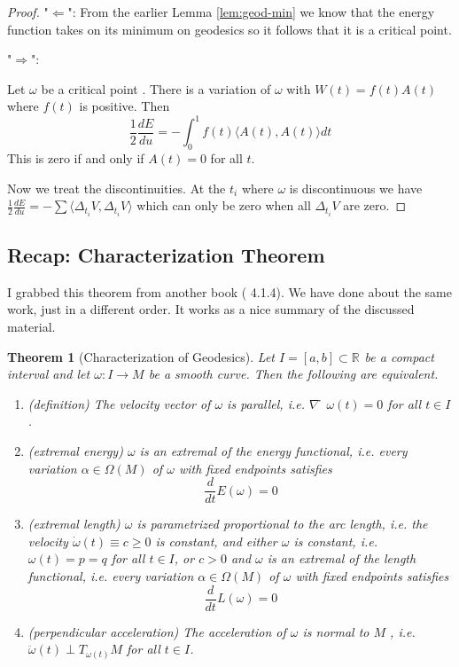 \documentclass{article}
\newtheorem{thm}{Theorem}
\newtheorem{proof}{Proof}
\renewcommand{\Rn}[1][n]{\mathbb{R}^{#1}}
\newcommand{\angle}[1]{\langle #1 \rangle}
\newcommand{\ome}{ $\omega$ }
\begin{document}
\begin{proof}

    "$\Leftarrow$": From the earlier Lemma \ref{lem:geod-min} we know that the energy function takes on its minimum on geodesics so it follows that it is a critical point.

    "$\Rightarrow$":


    Let \ome be a critical point . There is a variation of \ome with $W(t) = f (t)A(t)$ where
    $f(t)$ is positive.
    Then
    \[
        \frac{1}{2}\frac{dE}{du} = - \int_0^1 f(t) \angle{A(t), A(t)} dt
    \]
    This is zero if and only if $A(t) = 0$ for all $t$.

    Now we treat the discontinuities. At the $t_i$ where \ome is discontinuous we have
    $\frac{1}{2}\frac{dE}{du} = -\sum \angle{\Delta_{t_i}V, \Delta_{t_i}V}$ which can only be zero when all $\Delta_{t_i}V$ are zero.


\end{proof}



\subsection{Recap: Characterization Theorem}


I grabbed this theorem from another book (\cite{salamon} 4.1.4).
We have done about the same work, just in a different order.
It works as a nice summary of the discussed material.

\begin{thm}[Characterization of Geodesics]
    Let $I = [a, b] \subset \Rn[]$ be a compact interval and let $\omega : I \rightarrow M$ be a
    smooth curve. Then the following are equivalent.

    \begin{enumerate}
        \item
            (definition)
            The velocity vector of $\omega$ is parallel, i.e. $\nabla  ̇\omega(t) = 0$ for all $t \in I$.
        \item
            (extremal energy) $\omega$ is an extremal of the energy functional, i.e. every variation $\alpha \in \Omega(M)$
            of $\omega$ with fixed endpoints satisfies
            \[
                \frac{d}{dt} E(\omega) = 0
            \]
        \item
            (extremal length)
            $\omega$ is parametrized proportional to the arc length, i.e. the velocity
            $\dot{\omega}(t) \equiv c ≥ 0$ is constant, and either $\omega$ is constant, i.e. $\omega(t) = p = q$ for
            all $t \in I$, or $c > 0$ and $\omega$ is an extremal of the length functional, i.e.
            every variation $\alpha \in \Omega(M)$ of $\omega$ with fixed endpoints satisfies
            \[
                \frac{d}{dt} L(\omega) = 0
            \]
        \item
            (perpendicular acceleration)
            The acceleration of $\omega$ is normal to $M$ , i.e. $\ddot{\omega}(t) \perp T_{\omega(t)}M$ for all $t \in I$.
    \end{enumerate}
\end{thm}
\end{document}
